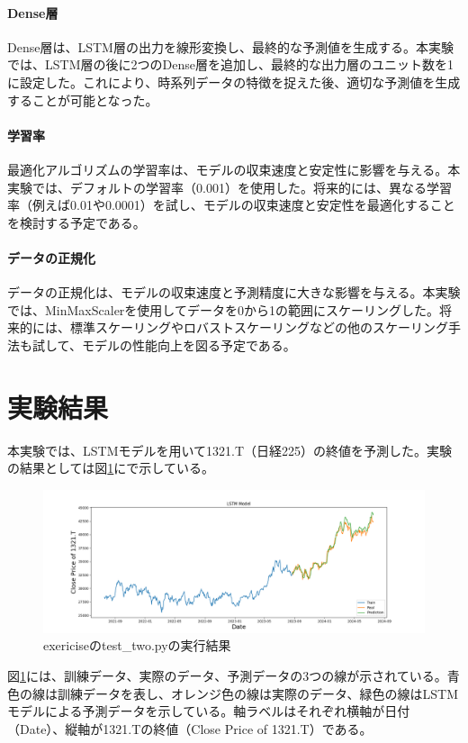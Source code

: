 \documentclass[a4paper, 11pt, titlepage]{jsarticle}
\begin{document}
\paragraph{Dense層}
\indent Dense層は、LSTM層の出力を線形変換し、最終的な予測値を生成する。本実験では、LSTM層の後に2つのDense層を追加し、最終的な出力層のユニット数を1に設定した。これにより、時系列データの特徴を捉えた後、適切な予測値を生成することが可能となった。

\paragraph{学習率}
\indent 最適化アルゴリズムの学習率は、モデルの収束速度と安定性に影響を与える。本実験では、デフォルトの学習率（0.001）を使用した。将来的には、異なる学習率（例えば0.01や0.0001）を試し、モデルの収束速度と安定性を最適化することを検討する予定である。

\paragraph{データの正規化}
\indent データの正規化は、モデルの収束速度と予測精度に大きな影響を与える。本実験では、MinMaxScalerを使用してデータを0から1の範囲にスケーリングした。将来的には、標準スケーリングやロバストスケーリングなどの他のスケーリング手法も試して、モデルの性能向上を図る予定である。

\section{実験結果}
\indent 本実験では、LSTMモデルを用いて1321.T（日経225）の終値を予測した。実験の結果としては図\ref{twopython}にで示している。
\begin{figure}[htbp]
  \centering
  \includegraphics[width=120mm]{./exericise/image/lstm_model.png}
  \caption{exericiseのtest\_two.pyの実行結果}
  \label{twopython}
\end{figure}
\indent 図\ref{twopython}には、訓練データ、実際のデータ、予測データの3つの線が示されている。青色の線は訓練データを表し、オレンジ色の線は実際のデータ、緑色の線はLSTMモデルによる予測データを示している。軸ラベルはそれぞれ横軸が日付（Date）、縦軸が1321.Tの終値（Close Price of 1321.T）である。
\end{document}
